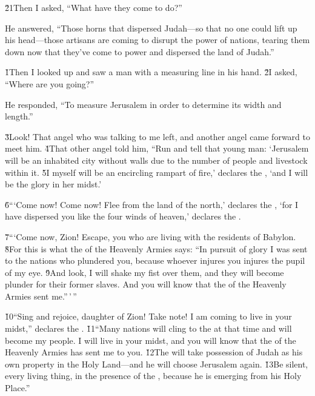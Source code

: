 \v{21}Then I asked, ``What have they come to do?''

He answered, ``Those horns that dispersed Judah---so that no one could lift up his head---those artisans are coming to disrupt the power of nations, tearing them down now that they've come to power and dispersed the land of Judah.''

\v{1}Then I looked up and saw a man with a measuring line in his hand. \v{2}I asked, ``Where are you going?''

He responded, ``To measure Jerusalem in order to determine its width and length.''

\v{3}Look! That angel who was talking to me left, and another angel came forward to meet him. \v{4}That other angel told him, ``Run and tell that young man: `Jerusalem will be an inhabited city without walls due to the number of people and livestock within it. \v{5}I myself will be an encircling rampart of fire,' declares the , `and I will be the glory in her midst.'

\v{6}```Come now! Come now! Flee from the land of the north,' declares the , `for I have dispersed you like the four winds of heaven,' declares the .

\v{7}```Come now, Zion! Escape, you who are living with the residents of Babylon. \v{8}For this is what the  of the Heavenly Armies says: ``In pursuit of glory I was sent to the nations who plundered you, because whoever injures you injures the pupil of my eye. \v{9}And look, I will shake my fist over them, and they will become plunder for their former slaves. And you will know that the  of the Heavenly Armies sent me.''\,'\,''

\v{10}``Sing and rejoice, daughter of Zion! Take note! I am coming to live in your midst,'' declares the . \v{11}``Many nations will cling to the  at that time and will become my people. I will live in your midst, and you will know that the  of the Heavenly Armies has sent me to you. \v{12}The  will take possession of Judah as his own property in the Holy Land---and he will choose Jerusalem again. \v{13}Be silent, every living thing, in the presence of the , because he is emerging from his Holy Place.''

